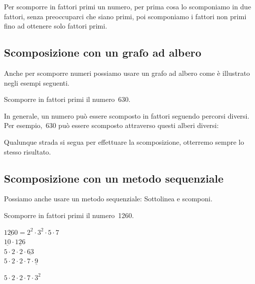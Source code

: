 Per scomporre in fattori primi un numero, per prima cosa lo scomponiamo in 
due fattori, senza preoccuparci che siano primi, poi scomponiamo i fattori
non primi fino ad ottenere solo fattori primi.

\subsection{Scomposizione con un grafo ad albero}

Anche per scomporre numeri possiamo usare un grafo ad albero come è 
illustrato negli esempi seguenti.

\begin{esempio}{}{}
Scomporre in fattori primi il numero~630.

\vspace{-1em}
{\scompa}
\end{esempio}

In generale, un numero può essere scomposto in fattori seguendo percorsi 
diversi. Per esempio,~630 può essere scomposto attraverso questi alberi
diversi:


Qualunque strada si segua per effettuare la scomposizione, 
otterremo sempre lo stesso risultato.

\subsection{Scomposizione con un metodo sequenziale}

Possiamo anche usare un metodo sequenziale:
Sottolinea e scomponi.

\begin{esempio}{}{}
Scomporre in fattori primi il numero~1260.

\vspace{.5em}
\(\underline{1260} = 2^{2} \cdot 3^{2} \cdot 5 \cdot 7\)\\
\(\underline{10} \cdot \underline{126}\)\\
\(5 \cdot 2 \cdot 2 \cdot \underline{63}\)\\
\(5 \cdot 2 \cdot 2 \cdot 7 \cdot \underline{9}\)

\(5 \cdot 2 \cdot 2 \cdot 7 \cdot 3^{2}\)

\end{esempio}

